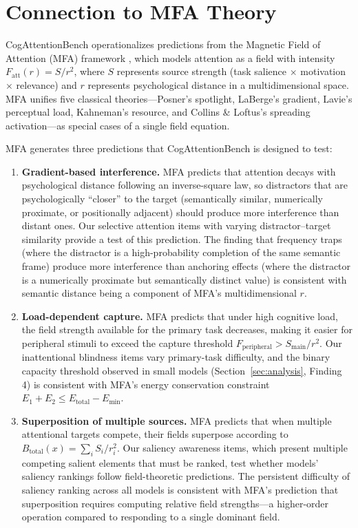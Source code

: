 \documentclass{article}
\begin{document}
\section{Connection to MFA Theory}

CogAttentionBench operationalizes predictions from the Magnetic Field of Attention (MFA) framework \citep{zeng2026}, which models attention as a field with intensity $F_{\mathrm{att}}(r) = S/r^2$, where $S$ represents source strength (task salience $\times$ motivation $\times$ relevance) and $r$ represents psychological distance in a multidimensional space. MFA unifies five classical theories---Posner's \citep{posner1980} spotlight, LaBerge's \citep{laberge1983} gradient, Lavie's \citep{lavie1995} perceptual load, Kahneman's \citep{kahneman1973} resource, and Collins \& Loftus's \citep{collins1975} spreading activation---as special cases of a single field equation.

MFA generates three predictions that CogAttentionBench is designed to test:

\begin{enumerate}
    \item \textbf{Gradient-based interference.} MFA predicts that attention decays with psychological distance following an inverse-square law, so distractors that are psychologically ``closer'' to the target (semantically similar, numerically proximate, or positionally adjacent) should produce more interference than distant ones. Our selective attention items with varying distractor--target similarity provide a test of this prediction. The finding that frequency traps (where the distractor is a high-probability completion of the same semantic frame) produce more interference than anchoring effects (where the distractor is a numerically proximate but semantically distinct value) is consistent with semantic distance being a component of MFA's multidimensional $r$.
    \item \textbf{Load-dependent capture.} MFA predicts that under high cognitive load, the field strength available for the primary task decreases, making it easier for peripheral stimuli to exceed the capture threshold $F_{\mathrm{peripheral}} > S_{\mathrm{main}}/r^2$. Our inattentional blindness items vary primary-task difficulty, and the binary capacity threshold observed in small models (Section~\ref{sec:analysis}, Finding 4) is consistent with MFA's energy conservation constraint $E_1 + E_2 \leq E_{\mathrm{total}} - E_{\mathrm{min}}$.
    \item \textbf{Superposition of multiple sources.} MFA predicts that when multiple attentional targets compete, their fields superpose according to $B_{\mathrm{total}}(x) = \sum_i S_i / r_i^2$. Our saliency awareness items, which present multiple competing salient elements that must be ranked, test whether models' saliency rankings follow field-theoretic predictions. The persistent difficulty of saliency ranking across all models is consistent with MFA's prediction that superposition requires computing relative field strengths---a higher-order operation compared to responding to a single dominant field.
\end{enumerate}
\end{document}
